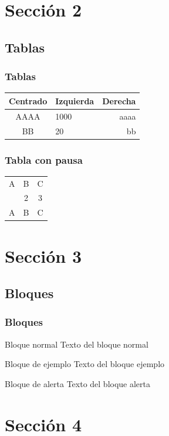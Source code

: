 \documentclass{beamer}
\begin{document}
\section{Sección 2} 
\subsection{Tablas}

\begin{frame}
\frametitle{Tablas}
\begin{tabular}{|c|l|r|} \hline
\textbf{Centrado} & \textbf{Izquierda} & \textbf{Derecha} \\ \hline
AAAA  & 1000 & aaaa \\ \hline
BB    & 20   & bb \\ \hline
\end{tabular}
\end{frame}

\begin{frame}
\frametitle{Tabla con pausa}
\begin{tabular}{c c c}
A & B & C \\ \pause 
1 & 2 & 3 \\  \pause 
A & B & C \\ 
\end{tabular} 
\end{frame}

\section{Sección 3}
\subsection{Bloques}

\begin{frame}
\frametitle{Bloques}

\begin{block}{Bloque normal}
Texto del bloque normal
\end{block}

\begin{exampleblock}{Bloque de ejemplo}
Texto del bloque ejemplo
\end{exampleblock}

\begin{alertblock}{Bloque de alerta}
Texto del bloque alerta
\end{alertblock}
\end{frame}

\section{Sección 4}
\end{document}
